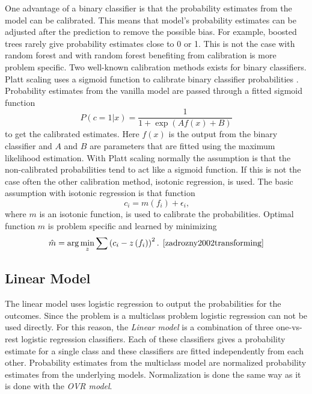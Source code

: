 One advantage of a binary classifier is that the probability estimates from the model can be calibrated. This means that model's probability estimates can be adjusted after the prediction to remove the possible bias. For example, boosted trees rarely give probability estimates close to 0 or 1. This is not the case with random forest and with random forest benefiting from calibration is more problem specific. \cite{niculescu2005predicting} Two well-known calibration methods exists for binary classifiers. Platt scaling uses a sigmoid function to calibrate binary classifier probabilities \cite{platt1999probabilistic}. Probability estimates from the vanilla model are passed through a fitted sigmoid function
\begin{equation}
P ( c = 1 | x ) = \frac { 1 } { 1 + \exp ( A f(x) + B ) }
\end{equation}
to get the calibrated estimates. Here $f(x)$ is the output from the binary classifier and $A$ and $B$ are parameters that are fitted using the maximum likelihood estimation. With Platt scaling normally the assumption is that the non-calibrated probabilities tend to act like a sigmoid function. If this is not the case often the other calibration method, isotonic regression, is used. The basic assumption with isotonic regression is that function
\begin{equation}
c _ { i } = m \left( f _ { i } \right) + \epsilon _ { i } \text{,}
\end{equation}
where $m$ is an isotonic function, is used to calibrate the probabilities. Optimal function $m$ is problem specific and learned by minimizing
\begin{equation}
\hat { m } = \arg \min _ { z } \sum \left( c _ { i } - z \left( f _ { i } \right) \right) ^ { 2 } \text{. \cite{zadrozny2002transforming}}
\end{equation}

\subsection{Linear Model}
The linear model uses logistic regression to output the probabilities for the outcomes. Since the problem is a multiclass problem logistic regression can not be used directly. For this reason, the \textit{Linear model} is a combination of three one-vs-rest logistic regression classifiers. Each of these classifiers gives a probability estimate for a single class and these classifiers are fitted independently from each other. Probability estimates from the multiclass model are normalized probability estimates from the underlying models. Normalization is done the same way as it is done with the \textit{OVR model}.

